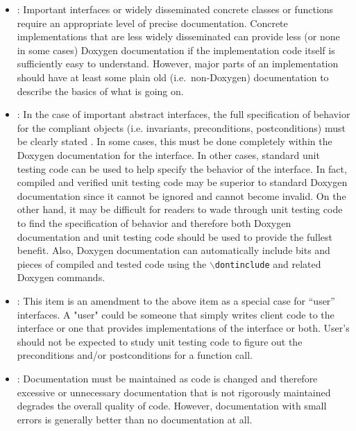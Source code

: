 \begin{itemize}


{}\item\DOXPVariableLevelOfDetail: Important interfaces or widely disseminated
concrete classes or functions require an appropriate level of precise
documentation.  Concrete implementations that are less widely disseminated can
provide less (or none in some cases) Doxygen documentation if the
implementation code itself is sufficiently easy to understand.  However, major
parts of an implementation should have at least some plain old (i.e.\
non-Doxygen) documentation to describe the basics of what is going on.


{}\item\DOXPFullyDocumentInterfaces: In the case of important abstract
interfaces, the full specification of behavior for the compliant
objects (i.e. invariants, preconditions, postconditions) must be
clearly stated {}\cite[Item 69]{C++CodingStandards05}.  In some cases,
this must be done completely within the Doxygen documentation for the
interface.  In other cases, standard unit testing code can be used to
help specify the behavior of the interface.  In fact, compiled and
verified unit testing code may be superior to standard Doxygen
documentation since it cannot be ignored and cannot become invalid.
On the other hand, it may be difficult for readers to wade through
unit testing code to find the specification of behavior and therefore
both Doxygen documentation and unit testing code should be used to
provide the fullest benefit.  Also, Doxygen documentation can
automatically include bits and pieces of compiled and tested code
using the {}\texttt{$\backslash$dontinclude} and related Doxygen
commands.


{}\item\DOXPFullyDocumentUserIntefaces: This item is an amendment to the above
item as a special case for ``user'' interfaces.  A "user" could be someone
that simply writes client code to the interface or one that provides
implementations of the interface or both.  User's should not be expected to
study unit testing code to figure out the preconditions and/or postconditions
for a function call.


{}\item\DOXPWrongDocumentationBad: Documentation must be maintained as code is
changed and therefore excessive or unnecessary documentation that is not
rigorously maintained degrades the overall quality of code.  However,
documentation with small errors is generally better than no documentation at
all.



\end{itemize}
